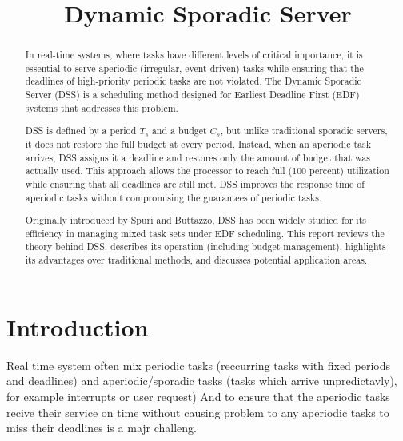 \documentclass[conference]{IEEEtran}
\begin{document}
\title{ Dynamic Sporadic Server\\

}

\author{

}

\maketitle

\begin{abstract}
In real-time systems, where tasks have different levels of critical importance, it is essential to serve aperiodic (irregular, event-driven) tasks while ensuring that the deadlines of high-priority periodic tasks are not violated. The Dynamic Sporadic Server (DSS) is a scheduling method designed for Earliest Deadline First (EDF) systems that addresses this problem. 

DSS is defined by a period  $T_s$ and a budget $C_s$, but unlike traditional sporadic servers, it does not restore the full budget at every period. Instead, when an aperiodic task arrives, DSS assigns it a deadline and restores only the amount of budget that was actually used. This approach allows the processor to reach full (100 percent) utilization while ensuring that all deadlines are still met. DSS improves the response time of aperiodic tasks without compromising the guarantees of periodic tasks.

Originally introduced by Spuri and Buttazzo\cite{spuri1994efficient}, DSS has been widely studied for its efficiency in managing mixed task sets under EDF scheduling. This report reviews the theory behind DSS, describes its operation (including budget management), highlights its advantages over traditional methods, and discusses potential application areas.
 
\end{abstract}

\section{Introduction}

Real time system often mix periodic tasks (reccurring tasks with fixed periods and deadlines) and aperiodic/sporadic tasks (tasks which arrive unpredictavly), for example interrupts or user request) And to ensure that the aperiodic tasks recive their service on time without causing problem to any aperiodic tasks to miss their deadlines is a majr challeng\cite{laplante2011real}. 
\end{document}
